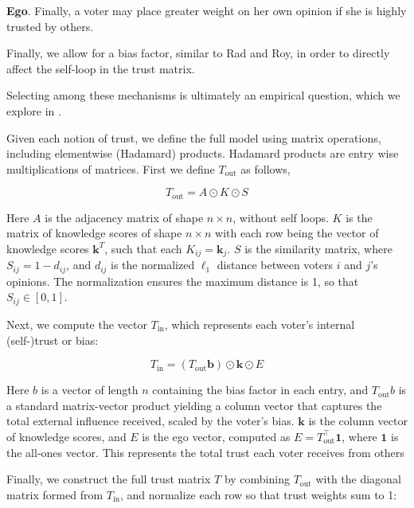 \textbf{Ego}. Finally, a voter may place greater weight on her own opinion if
she is highly trusted by others.

Finally, we allow for a bias factor, similar to Rad and Roy, in order to
directly affect the self-loop in the trust matrix.

Selecting among these mechanisms is ultimately an empirical question, which we explore in .

Given each notion of trust, we define the full model using matrix operations,
including elementwise (Hadamard) products. Hadamard products are entry wise
multiplications of matrices. First we define $T_{\text{out}}$ as follows,

\begin{equation}
	T_{\text{out}} = A \odot  K \odot S
	\label{eq:mat_out_trust}
\end{equation}

Here $A$ is the adjacency matrix of shape $n \times n$, without self loops. $K$
is the matrix of knowledge scores of shape $n \times n$ with each row being
the vector of knowledge scores $\boldsymbol{k}^T$, such that each $K_{ij} =
	\boldsymbol{k}_j$. $S$ is the similarity matrix, where $S_{ij} = 1 - d_{ij}$,
and $d_{ij}$ is the normalized $\ell_1$ distance between voters $i$ and $j$’s
opinions. The normalization ensures the maximum distance is 1, so that $S_{ij}
	\in [0, 1]$.

Next, we compute the vector $T_{\text{in}}$, which represents each voter’s internal (self-)trust or bias:

\begin{equation}
	T_{\text{in}} = (T_{\text{out}} \boldsymbol{b}) \odot \boldsymbol{k} \odot E
	\label{eq:in_trust}
\end{equation}

Here $b$ is a vector of length $n$ containing the bias factor in each entry,
and $T_{\text{out}} b$ is a standard matrix-vector product yielding a column
vector that captures the total external influence received, scaled by the
voter's bias. $\boldsymbol{k}$ is the column vector of knowledge scores, and
$E$ is the ego vector, computed as $E = T_{\text{out}}^\top
	\boldsymbol{1}$, where $\boldsymbol{1}$ is the all-ones vector. This represents
the total trust each voter receives from others


Finally, we construct the full trust matrix $T$ by combining $T_{\text{out}}$ with the diagonal matrix formed from $T_{\text{in}}$, and normalize each row so that trust weights sum to 1:


